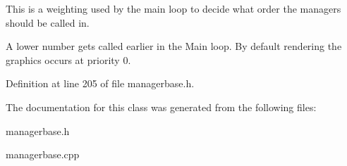 This is a weighting used by the main loop to decide what order the managers should be called in. 

A lower number gets called earlier in the Main loop. By default rendering the graphics occurs at priority 0. 

Definition at line 205 of file managerbase.h.



The documentation for this class was generated from the following files:\begin{DoxyCompactItemize}
\item 
managerbase.h\item 
managerbase.cpp\end{DoxyCompactItemize}
